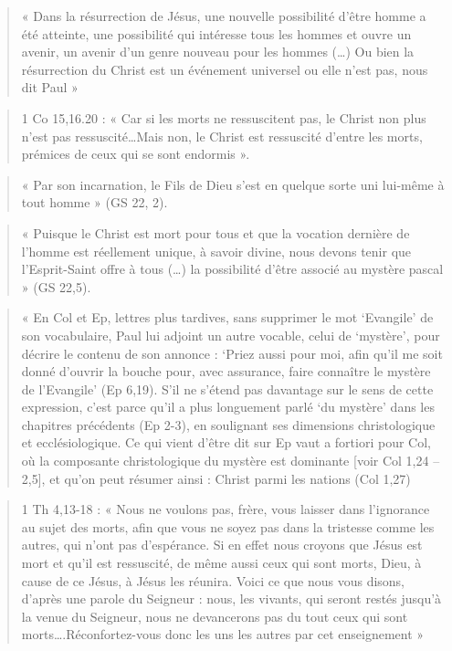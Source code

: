 \begin{quote}
    « Dans la résurrection de Jésus, une nouvelle possibilité d'être homme a
été atteinte, une possibilité qui intéresse tous les hommes et ouvre un
avenir, un avenir d'un genre nouveau pour les hommes (\ldots) Ou bien la
résurrection du Christ est un événement universel ou elle n'est pas,
nous dit Paul » 
\end{quote}

\begin{quote}
    1 Co 15,16.20 : « Car si les morts ne ressuscitent pas, le Christ non
plus n'est pas ressuscité\ldots Mais non, le Christ est ressuscité
d'entre les morts, prémices de ceux qui se sont endormis ».
\end{quote}

\begin{quote}
    « Par son incarnation, le Fils de Dieu s'est en quelque sorte uni
lui-même à tout homme » (GS 22, 2).
\end{quote}

\begin{quote}
    « Puisque le Christ est mort pour tous et que la vocation dernière de
l'homme est réellement unique, à savoir divine, nous devons tenir que
l'Esprit-Saint offre à tous (\ldots) la possibilité d'être associé au
mystère pascal » (GS 22,5).
\end{quote}

\begin{quote}
    « En Col et Ep, lettres plus tardives, sans supprimer le mot `Evangile'
de son vocabulaire, Paul lui adjoint un autre vocable, celui de
`mystère', pour décrire le contenu de son annonce : `Priez aussi pour
moi, afin qu'il me soit donné d'ouvrir la bouche pour, avec assurance,
faire connaître le mystère de l'Evangile' (Ep 6,19). S'il ne s'étend pas
davantage sur le sens de cette expression, c'est parce qu'il a plus
longuement parlé `du mystère' dans les chapitres précédents (Ep 2-3), en
soulignant ses dimensions christologique et ecclésiologique. Ce qui
vient d'être dit sur Ep vaut a fortiori pour Col, où la composante
christologique du mystère est
dominante {[}voir Col 1,24 -- 2,5{]}, et qu'on peut résumer ainsi :
Christ parmi les nations (Col 1,27) 
\end{quote}

\begin{quote}
   1 Th 4,13-18 : « Nous ne voulons pas, frère, vous laisser dans
l'ignorance au sujet des morts, afin que vous ne soyez pas dans la
tristesse comme les autres, qui n'ont pas d'espérance. Si en effet nous
croyons que Jésus est mort et qu'il est ressuscité, de même aussi ceux
qui sont morts, Dieu, à cause de ce Jésus, à Jésus les réunira. Voici ce
que nous vous disons, d'après une parole du Seigneur : nous, les
vivants, qui seront restés jusqu'à la venue du Seigneur, nous ne
devancerons pas du tout ceux qui sont morts\ldots.Réconfortez-vous donc
les uns les autres par cet enseignement » 
\end{quote}

